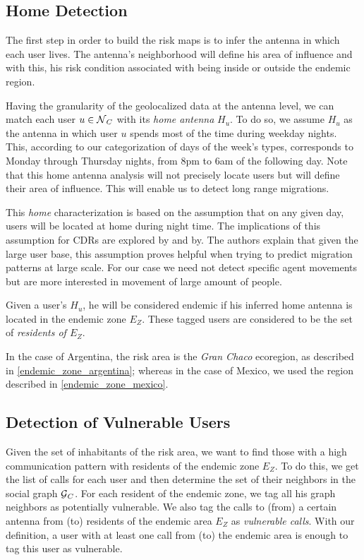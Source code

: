 \subsection{Home Detection}\label{subsection:home_detection}

The first step in order to build the risk maps is to infer the antenna in which each user lives.
The antenna's neighborhood will define his area of influence and with this, his risk condition associated with being inside or outside the endemic region.

Having the granularity of the geolocalized data at the antenna level, we can match each user $u \in \operatorname{\mathcal{N}}_C$ with its \textit{home antenna} $H_u$.
To do so, we assume $H_u$ as the antenna in which user $u$ spends most of the time during weekday nights.
This, according to our categorization of days of the week's types, corresponds to Monday through Thursday nights, from 8pm to 6am of the following day.
Note that this home antenna analysis will not precisely locate users but will define their area of influence.
This will enable us to detect long range migrations.

This \textit{home} characterization is based on the assumption that on any given day, users will be located at home during night time.
The implications of this assumption for CDRs are explored by\cite{sarraute2015socialevents} and by\cite{csaji2012exploring}.
The authors explain that given the large user base, this assumption proves helpful when trying to predict migration patterns at large scale.
For our case we need not detect specific agent movements but are more interested in movement of large amount of people.

Given a user's $H_u$, he will be considered endemic if his inferred home antenna is located in the endemic zone $E_Z$.
These tagged users are considered to be the set of \textit{residents of $E_Z$}.

In the case of Argentina, the risk area is the \textit{Gran Chaco} ecoregion, as described in \cref{endemic_zone_argentina};
whereas in the case of Mexico, we used the region described in \cref{endemic_zone_mexico}.


\subsection{Detection of Vulnerable Users}\label{subsection:vulnerable_users_detection}

Given the set of inhabitants of the risk area, we want to find those with a high communication pattern with residents of the endemic zone $E_Z$.
To do this, we get the list of calls for each user and then determine the set of their neighbors in the social graph $\operatorname{\mathcal{G}}_C$.
For each resident of the endemic zone, we tag all his graph neighbors as potentially vulnerable.
We also tag the calls to (from) a certain antenna from (to) residents of the endemic area $E_Z$ as \textit{vulnerable calls}.
With our definition, a user with at least one call from (to) the endemic area is enough to tag this user as vulnerable.

